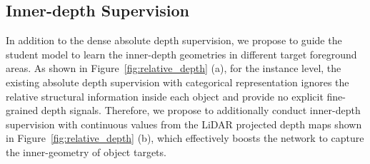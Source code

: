 


\vspace{0.1cm}
\subsection{Inner-depth Supervision}
\label{sec:Inner-depth Supervision}

In addition to the dense absolute depth supervision, we propose to guide the student model to learn the inner-depth geometries in different target foreground areas. As shown in Figure~\ref{fig:relative_depth} (a), for the instance level, the existing absolute depth supervision with categorical representation ignores the relative structural information inside each object and provide no explicit fine-grained depth signals. Therefore, we propose to additionally conduct inner-depth supervision with continuous values from the LiDAR projected depth maps shown in Figure~\ref{fig:relative_depth} (b), which effectively boosts the network to capture the inner-geometry of object targets.

